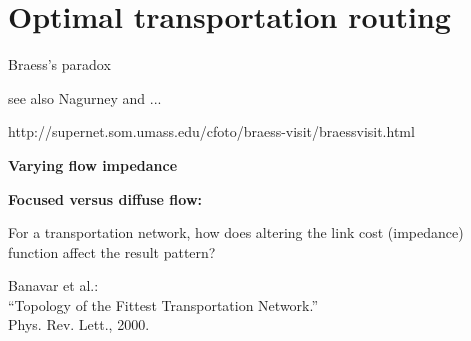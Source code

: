 \section{Optimal transportation routing}

  



Braess's paradox\cite{braess1968a,braess2005a,nagurney2005a}

see also Nagurney and ...

http://supernet.som.umass.edu/cfoto/braess-visit/braessvisit.html


  \textbf{Varying flow impedance}

  \textbf{Focused versus diffuse flow:}
  
  
    For a transportation network, how does
    altering the link cost (impedance) function
    affect the result pattern?
  
    Banavar et al.\cite{banavar2000a}:\\
    ``Topology of the Fittest Transportation Network.''\\
    Phys. Rev. Lett., 2000.
  
    
  

  
